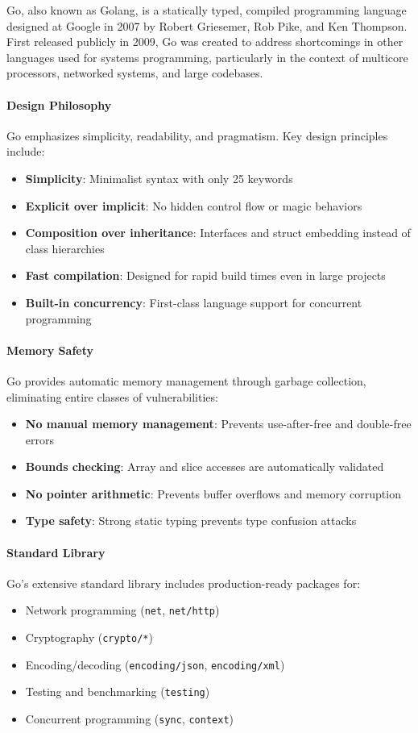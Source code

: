 Go, also known as Golang, is a statically typed, compiled programming language designed at Google in 2007 by Robert Griesemer, Rob Pike, and Ken Thompson. First released publicly in 2009, Go was created to address shortcomings in other languages used for systems programming, particularly in the context of multicore processors, networked systems, and large codebases.

\paragraph{Design Philosophy}
Go emphasizes simplicity, readability, and pragmatism. Key design principles include:
\begin{itemize}
    \item \textbf{Simplicity}: Minimalist syntax with only 25 keywords
    \item \textbf{Explicit over implicit}: No hidden control flow or magic behaviors
    \item \textbf{Composition over inheritance}: Interfaces and struct embedding instead of class hierarchies
    \item \textbf{Fast compilation}: Designed for rapid build times even in large projects
    \item \textbf{Built-in concurrency}: First-class language support for concurrent programming
\end{itemize}

\paragraph{Memory Safety}
Go provides automatic memory management through garbage collection, eliminating entire classes of vulnerabilities:
\begin{itemize}
    \item \textbf{No manual memory management}: Prevents use-after-free and double-free errors
    \item \textbf{Bounds checking}: Array and slice accesses are automatically validated
    \item \textbf{No pointer arithmetic}: Prevents buffer overflows and memory corruption
    \item \textbf{Type safety}: Strong static typing prevents type confusion attacks
\end{itemize}

\paragraph{Standard Library}
Go's extensive standard library includes production-ready packages for:
\begin{itemize}
    \item Network programming (\texttt{net}, \texttt{net/http})
    \item Cryptography (\texttt{crypto/*})
    \item Encoding/decoding (\texttt{encoding/json}, \texttt{encoding/xml})
    \item Testing and benchmarking (\texttt{testing})
    \item Concurrent programming (\texttt{sync}, \texttt{context})
\end{itemize}

